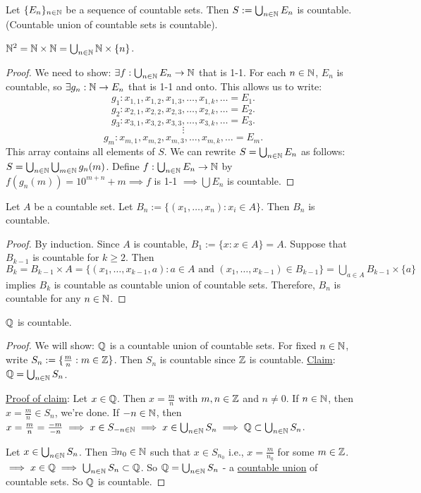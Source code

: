 \documentclass[]{article}
\begin{document}
\begin{theorem}
	Let $\{E_n\}_{n\in\mathbb{N}}$ be a sequence of countable sets.
	Then $S:=\bigcup_{n\in\mathbb{N}} E_n$ is countable. (Countable union of countable sets is countable).
\end{theorem}
\begin{example}
	$\mathbb{N}^2 = \mathbb{N}\times \mathbb{N} = \bigcup_{n\in\mathbb{N}} \mathbb{N}\times \{n\}$.
\end{example}
\begin{proof}
	We need to show: $\exists f:\bigcup_{n\in\mathbb{N}} E_n \rightarrow \mathbb{N}$ that is 1-1.
	For each $n\in\mathbb{N}$, $E_n$ is countable, so $\exists g_n: \mathbb{N}\rightarrow E_n$ that is 1-1 and onto.
	This allows us to write: $$g_1: x_{1,1}, x_{1,2}, x_{1,3},\dots,x_{1,k},\dots = E_1.$$
	$$g_2: x_{2,1}, x_{2,2}, x_{2,3},\dots,x_{2,k},\dots = E_2.$$
	$$g_3: x_{3,1}, x_{3,2}, x_{3,3},\dots,x_{3,k},\dots = E_3.$$
	$$ \vdots$$
	$$g_m: x_{m,1}, x_{m,2}, x_{m,3},\dots,x_{m,k},\dots = E_m.$$
	This array contains all elements of $S$.
	We can rewrite $S = \bigcup_{n\in\mathbb{N}} E_n$ as follows: $S = \bigcup_{n\in\mathbb{N}} \bigcup_{m\in\mathbb{N}} g_n(m)$.
	Define $f:\bigcup_{n\in\mathbb{N}} E_n \rightarrow \mathbb{N}$ by
	$ f(g_n(m)) = 10^{m+n} + m \implies f$ is 1-1 $\implies \bigcup E_n$ is countable.
\end{proof}

\begin{theorem}
	Let $A$ be a countable set. Let $B_n:= \{(x_1,\dots,x_n):x_i\in A\}$.
	Then $B_n$ is countable.
\end{theorem}
\begin{proof}
	By induction. Since $A$ is countable, $B_1:= \{ x: x\in A\} = A$.
	Suppose that $B_{k-1}$ is countable for $k \geq 2$. Then $B_k = B_{k-1}\times A = \{(x_1,\dots,x_{k-1},a): a\in A \text{ and } (x_1,\dots,x_{k-1})\in B_{k-1}\} = \bigcup_{a\in A} B_{k-1}\times \{a\}$ implies $B_k$ is countable as countable union of countable sets.
	Therefore, $B_n$ is countable for any $n\in\mathbb{N}$.
\end{proof}
\begin{corollary}
	$\mathbb{Q}$ is countable.
\end{corollary}
\begin{proof}
	We will show: $\mathbb{Q}$ is a countable union of countable sets.
	For fixed $n\in\mathbb{N}$, write $S_n:=\{\frac{m}{n}:m\in\mathbb{Z}\}$. Then $S_n$ is countable since $\mathbb{Z}$ is countable.
	\ul{Claim}: $\mathbb{Q} = \bigcup_{n\in\mathbb{N}} S_n$.
	
	\ul{Proof of claim}: \say{$\subset$} Let $x\in\mathbb{Q}$. Then $x = \frac{m}{n}$ with $m,n\in\mathbb{Z}$ and $n\neq 0$.
	If $n\in\mathbb{N}$, then $x = \frac{m}{n}\in S_n$, we're done.
	If $-n\in\mathbb{N}$, then $x = \frac{m}{n} = \frac{-m}{-n} \implies x\in S_{-n\in\mathbb{N}} \implies x\in\bigcup_{n\in\mathbb{N}} S_n \implies \mathbb{Q}\subset\bigcup_{n\in\mathbb{N}} S_n$.

	\say{$\supset$} Let $x\in\bigcup_{n\in\mathbb{N}} S_n$. Then $\exists n_0\in\mathbb{N}$ such that $x\in S_{n_0}$ i.e., $x=\frac{m}{n_0}$ for some $m\in\mathbb{Z}$. $\implies x\in\mathbb{Q} \implies \bigcup_{n\in\mathbb{N}}S_n\subset \mathbb{Q}$.	
	So $\mathbb{Q} = \bigcup_{n\in\mathbb{N}} S_n$ - a \ul{countable union} of countable sets.
	So $\mathbb{Q}$ is countable.
\end{proof}
\end{document}
